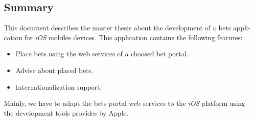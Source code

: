 \begin{otherlanguage}{english}

\chapter*{Summary}

This document describes the master thesis about the development of a bets application for \emph{iOS} mobiles devices. This application contains the following features:
\begin{itemize}
 \item Place bets using the web services of a choosed bet portal.
 \item Advise about placed bets.
 \item Internationalization support.
 \end{itemize}
 Mainly, we have to adapt the bets portal web services to the \emph{iOS} platform using the development tools provides by Apple.


\end{otherlanguage}

